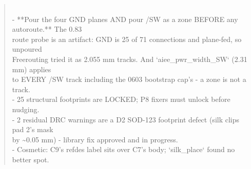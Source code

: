 \documentclass[11pt,a4paper]{article}
\begin{document}
\begin{quote}
~\\
- {*}{*}Pour the four GND planes AND pour /SW as a zone BEFORE any autoroute.{*}{*} The 0.83\\
  route probe is an artifact: GND is 25 of 71 connections and plane-fed, so unpoured\\
  Freerouting tried it as 2.055 mm tracks. And `aiee\_pwr\_width\_SW` (2.31 mm) applies\\
  to EVERY /SW track including the 0603 bootstrap cap's - a zone is not a track.\\
- 25 structural footprints are LOCKED; P8 fixers must unlock before nudging.\\
- 2 residual DRC warnings are a D2 SOD-123 footprint defect (silk clips pad 2's mask\\
  by \textasciitilde{}0.05 mm) - library fix approved and in progress.\\
- Cosmetic: C9's refdes label sits over C7's body; `silk\_place` found no better spot.
\end{quote}
\end{document}
